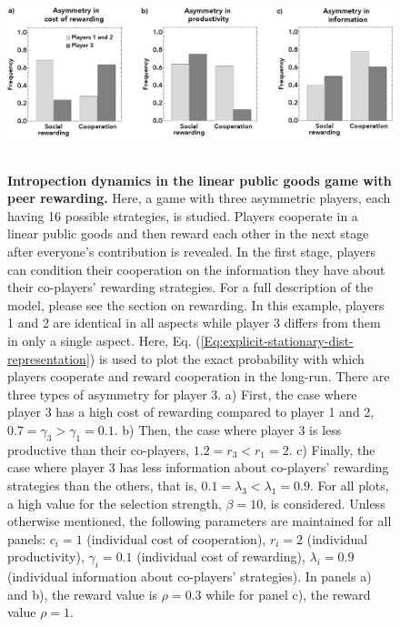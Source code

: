 \documentclass[11pt]{article}
\theoremstyle{plainCl1}
\theoremstyle{plainCl2}
\begin{document}
\clearpage
\begin{figure}
\centering
\includegraphics[width =  \textwidth]{figures/Fig4.eps}~\\[0.4cm]
\caption{\onehalfspacing
\textbf{Intropection dynamics in the linear public goods game with peer rewarding.} Here, a game with three asymmetric players, each having 16 possible strategies, is studied. Players cooperate in a linear public goods and then reward each other in the next stage after everyone's contribution is revealed. In the first stage, players can condition their cooperation on the information they have about their co-players' rewarding strategies. For a full description of the model, please see the section on rewarding. In this example, players 1 and 2 are identical in all aspects while player 3 differs from them in only a single aspect. Here, Eq. (\ref{Eq:explicit-stationary-dist-representation}) is used to plot the exact probability with which players cooperate and reward cooperation in the long-run. There are three types of asymmetry for player 3. a) First, the case where player 3 has a high cost of rewarding compared to player 1 and 2, $0.7 = \gamma_3 > \gamma_1 = 0.1$. b) Then, the case where player 3 is less productive than their co-players, $1.2 = r_3 < r_1 = 2$. c) Finally, the case where player 3 has less information about co-players' rewarding strategies than the others, that is, $0.1 = \lambda_3 < \lambda_1 = 0.9$. For all plots, a high value for the selection strength, $\beta = 10$, is considered. Unless otherwise mentioned, the following parameters are maintained for all panels: $c_i = 1$ (individual cost of cooperation), $r_i = 2$ (individual productivity), $\gamma_i = 0.1$ (individual cost of rewarding), $\lambda_i = 0.9$ (individual information about co-players' strategies). In panels a) and b), the reward value is $\rho=0.3$ while for panel c), the reward value $\rho = 1$.}
\label{Fig:SocialRewarding}
\end{figure}

\clearpage

\newpage

\end{document}
